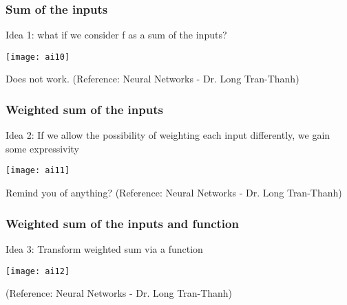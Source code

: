 %
%
%

\begin{frame}[fragile] \frametitle{Sum of the inputs}
Idea 1: what if we consider f as a sum of the inputs? 
\begin{center}
\texttt{[image: ai10]}
\end{center}
Does not work.
\tiny{(Reference: Neural Networks - Dr. Long Tran-Thanh)}
\end{frame}
\begin{frame}[fragile] \frametitle{Weighted sum of the inputs}
Idea 2: If we allow the possibility of weighting each input differently, we gain some expressivity 
\begin{center}
\texttt{[image: ai11]}
\end{center}
Remind you of anything?
\tiny{(Reference: Neural Networks - Dr. Long Tran-Thanh)}
\end{frame}

\begin{frame}[fragile] \frametitle{Weighted sum of the inputs and function}
Idea 3: Transform weighted sum via a function 
\begin{center}
\texttt{[image: ai12]}
\end{center}

\tiny{(Reference: Neural Networks - Dr. Long Tran-Thanh)}
\end{frame}

